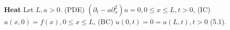 {\bf Heat } Let $L,a >0$. (PDE) $( \partial_t-a\partial_x^2)u=0, 0 \leq x \leq L, t > 0$, (IC) $u(x,0)=f(x), 0 \leq x \leq L$, (BC) $u(0,t)= 0 = u(L,t), t>0$ (5.1).
